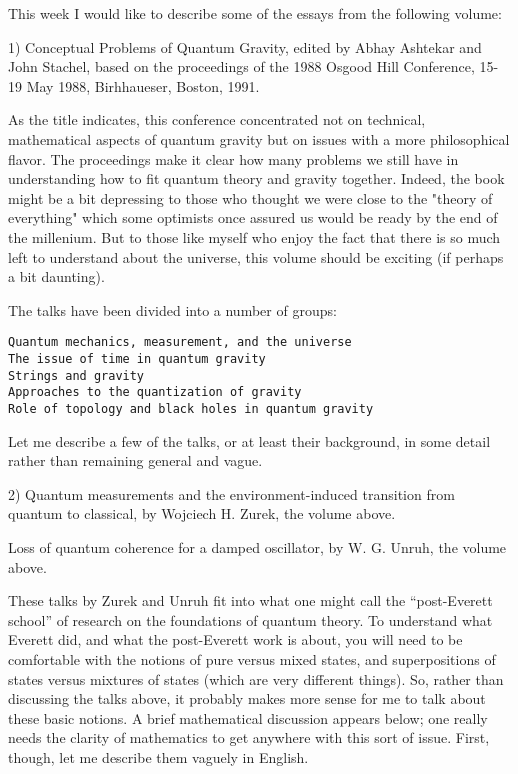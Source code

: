 

This week I would like to describe some of the essays from the
following volume:

1) Conceptual Problems of Quantum Gravity, edited by Abhay Ashtekar and
John Stachel, based on the proceedings of the 1988 Osgood Hill
Conference, 15-19 May 1988, Birhhaueser, Boston, 1991.

As the title indicates, this conference concentrated not on
technical, mathematical aspects of quantum gravity but on issues
with a more philosophical flavor.  The proceedings make it clear
how many problems we still have in understanding how to fit
quantum theory and gravity together.  Indeed, the book might be a
bit depressing to those who thought we were close to the "theory
of everything" which some optimists once assured us would be
ready by the end of the millenium.  But to those like myself who
enjoy the fact that there is so much left to understand about the
universe, this volume should be exciting (if perhaps a bit
daunting).

The talks have been divided into a number of groups:

\begin{verbatim}
Quantum mechanics, measurement, and the universe
The issue of time in quantum gravity
Strings and gravity
Approaches to the quantization of gravity
Role of topology and black holes in quantum gravity
\end{verbatim}
    

Let me describe a few of the talks, or at least their background, in
some detail rather than remaining general and vague.


2) Quantum measurements and the environment-induced transition from
quantum to classical, by Wojciech H. Zurek, the volume above.

Loss of quantum coherence for a damped oscillator, by W. G.
Unruh, the volume above.


These talks by Zurek and Unruh fit into what one might call the
``post-Everett school'' of research on the foundations of quantum
theory.  To understand what Everett did, and what the
post-Everett work is about, you will need to be comfortable with
the notions of pure versus mixed states, and superpositions of
states versus mixtures of states (which are very different
things).  So, rather than discussing the talks above, it probably
makes more sense for me to talk about these basic notions.   A
brief mathematical discussion  appears below; one really needs
the clarity of mathematics to get anywhere with this sort of
issue.  First, though, let me describe them vaguely in English.  

